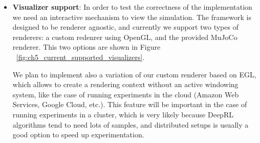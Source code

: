 \begin{itemize}
          In order to achieve the desired functionality we inject all the simulation
          resources into an XML that MuJoCo can then use to instantiate the scene,
          and making heavy use of object pools to reuse the resources that are
          defined in the XML file. A sample generated XML with all resources can
          be found \href{https://github.com/wpumacay/tysocMjc/blob/master/res/xml/workspace.xml}{here}
          \footnote{https://github.com/wpumacay/tysocMjc/blob/master/res/xml/workspace.xml}
          (which is a big XML file), and a sample model for an agent can be found
          \href{https://github.com/wpumacay/tysocMjc/blob/master/res/templates/mjcf/walker.xml}{here}
          \footnote{https://github.com/wpumacay/tysocMjc/blob/master/res/templates/mjcf/walker.xml}.

          The approach of using core functionality separated from backend specific
          functionality helps a lot in this situation because we do not have to
          couple the specific instantiation mechanisms (like in MuJoCo) to other
          mechanisms (like in Bullet and PhysX), and in the case that MuJoCo launches
          a release in the future with runtime creation support we can easily change
          the adapter code once and all other backend options will not need to be
          changed at all.

    \item \textbf{Visualizer support}: In order to test the correctness of the
          implementation we need an interactive mechanism to view the simulation.
          The framework is designed to be renderer agnostic, and currently we support
          two types of renderers: a custom redenrer using OpenGL, and the provided
          MuJoCo renderer. This two options are shown in Figure ~\ref{fig:ch5_current_supported_visualizers}.

          We plan to implement also a variation of our custom renderer based on
          EGL, which allows to create a rendering context without an active windowing
          system, like the case of running experiments in the cloud (Amazon Web Services,
          Google Cloud, etc.). This feature will be important in the case of running
          experiments in a cluster, which is very likely because DeepRL algorithms
          tend to need lots of samples, and distributed setups is usually a good
          option to speed up experimentation.

          \newpage
          \figSupportedVisualizers

\end{itemize}

